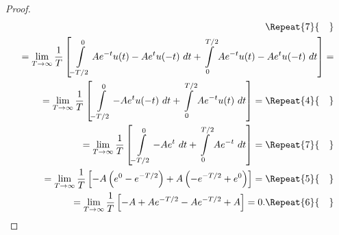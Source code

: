 \documentclass[12pt,oneside,openany]{memoir}
\numberwithin{equation}{subsection}
\newcommand{\quads}[1]{\Repeat{#1}{\quad}}
\newcommand{\dt}{\ dt}
\begin{document}
\begin{proof}
\begin{equation}
\begin{split}
	\quads{7}
	\\
	= \lim_{T \rightarrow \infty} \frac{1}{T} \left[\int\displaylimits_{-T/2}^{0} A e^{-t} u(t) - A e^{t} u(-t) \dt + \int\displaylimits_{0}^{T/2} A e^{-t} u(t) - A e^{t} u(-t) \dt \right] =
	\\
	= \lim_{T \rightarrow \infty} \frac{1}{T} \left[\int\displaylimits_{-T/2}^{0} - A e^{t} u(-t) \dt + \int\displaylimits_{0}^{T/2} A e^{-t} u(t) \dt \right] =
	\quads{4}
	\\
	= \lim_{T \rightarrow \infty} \frac{1}{T} \left[\int\displaylimits_{-T/2}^{0} - A e^{t} \dt + \int\displaylimits_{0}^{T/2} A e^{-t} \dt \right] =
	\quads{7}
	\\
	= \lim_{T \rightarrow \infty} \frac{1}{T} \left[-A \left(e^0 - e^{-T/2}\right) + A \left(-e^{-T/2} + e^0\right)\right] =
	\quads{5}
	\\
	= \lim_{T \rightarrow \infty} \frac{1}{T} \left[-A + Ae^{-T/2} - Ae^{-T/2} + A\right] = 0.
	\quads{6}
\end{split}
\end{equation}
\end{proof}

\newpage
\end{document}
